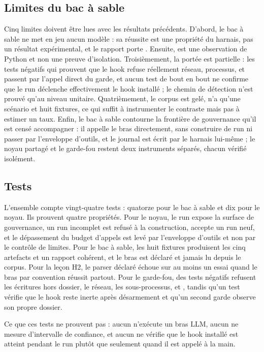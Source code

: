 \subsection{Limites du bac à sable}

Cinq limites doivent être lues avec les résultats précédents. D'abord, le bac à
sable ne met en jeu aucun modèle : sa réussite est une propriété du harnais, pas
un résultat expérimental, et le rapport porte .
Ensuite,  est une observation de Python et non une preuve
d'isolation. Troisièmement, la portée est partielle : les tests négatifs qui
prouvent que le hook refuse réellement réseau, processus,  et
 passent par l'appel direct du garde, et aucun test de bout en bout
ne confirme que le run déclenche effectivement le hook installé ; le chemin de
détection n'est prouvé qu'au niveau unitaire. Quatrièmement, le corpus est gelé,
n'a qu'une scénario et huit fixtures, ce qui suffit à instrumenter le contraste
mais pas à estimer un taux. Enfin, le bac à sable contourne la frontière de
gouvernance qu'il est censé accompagner : il appelle le bras directement, sans
construire de run ni passer par l'enveloppe d'outils, et le journal est écrit
par le harnais lui-même ; le noyau partagé et le garde-fou restent deux
instruments séparés, chacun vérifié isolément.

\subsection{Tests}

L'ensemble compte vingt-quatre tests : quatorze pour le bac à sable et dix pour
le noyau. Ils prouvent quatre propriétés. Pour le noyau, le run expose la
surface de gouvernance, un run incomplet est refusé à la construction,
 accepte un run neuf, et le dépassement du budget
d'appels est levé par l'enveloppe d'outils et non par le contrôle de limites.
Pour le bac à sable, les huit fixtures produisent les cinq artefacts et un
rapport cohérent, et le bras est déclaré et jamais lu depuis le corpus. Pour la
leçon H2, le parser déclaré échoue sur au moins un essai quand le bras par
convention réussit partout. Pour le garde-fou, des tests négatifs refusent les
écritures hors dossier, le réseau, les sous-processus,  et
, tandis qu'un test vérifie que le hook reste inerte après
désarmement et qu'un second garde observe son propre dossier.

Ce que ces tests ne prouvent pas : aucun n'exécute un bras LLM, aucun ne mesure
d'intervalle de confiance, et aucun ne vérifie que le hook installé est atteint
pendant le run plutôt que seulement quand il est appelé à la main.
